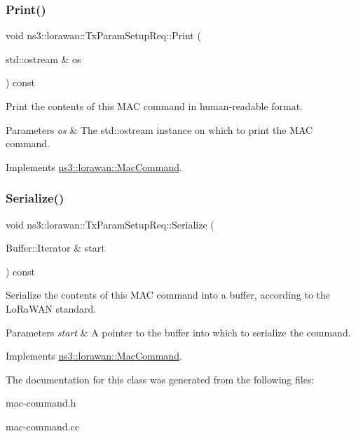 \subsubsection{\texorpdfstring{Print()}{Print()}}
{\footnotesize\ttfamily void ns3\+::lorawan\+::\+Tx\+Param\+Setup\+Req\+::\+Print (\begin{DoxyParamCaption}\item[{std\+::ostream \&}]{os }\end{DoxyParamCaption}) const\hspace{0.3cm}{\ttfamily [virtual]}}

Print the contents of this M\+AC command in human-\/readable format.


\begin{DoxyParams}{Parameters}
{\em os} & The std\+::ostream instance on which to print the M\+AC command. \\
\hline
\end{DoxyParams}


Implements \hyperlink{classns3_1_1lorawan_1_1MacCommand_a6bf88db38dab7dcd817811a9fb59f920}{ns3\+::lorawan\+::\+Mac\+Command}.

\mbox{\label{classns3_1_1lorawan_1_1TxParamSetupReq_a03dd6a1a48962c67b25e17d9799763f4}} 
\subsubsection{\texorpdfstring{Serialize()}{Serialize()}}
{\footnotesize\ttfamily void ns3\+::lorawan\+::\+Tx\+Param\+Setup\+Req\+::\+Serialize (\begin{DoxyParamCaption}\item[{Buffer\+::\+Iterator \&}]{start }\end{DoxyParamCaption}) const\hspace{0.3cm}{\ttfamily [virtual]}}

Serialize the contents of this M\+AC command into a buffer, according to the Lo\+Ra\+W\+AN standard.


\begin{DoxyParams}{Parameters}
{\em start} & A pointer to the buffer into which to serialize the command. \\
\hline
\end{DoxyParams}


Implements \hyperlink{classns3_1_1lorawan_1_1MacCommand_a0ed44b33942ddc3dc9694dc06ab0b87f}{ns3\+::lorawan\+::\+Mac\+Command}.



The documentation for this class was generated from the following files\+:\begin{DoxyCompactItemize}
\item 
mac-\/command.\+h\item 
mac-\/command.\+cc\end{DoxyCompactItemize}
